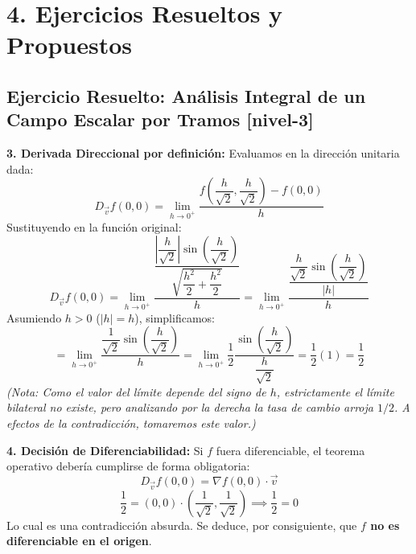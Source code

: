 \documentclass[11pt]{article}
\newenvironment{ejercicios}{%
  \section*{4. Ejercicios Resueltos y Propuestos}%
}{}
\newenvironment{ejercicioresuelto}[2]{\subsection*{Ejercicio Resuelto: #1 \small{[#2]}}}{}
\begin{document}
\begin{ejercicios}
\begin{ejercicioresuelto}{Análisis Integral de un Campo Escalar por Tramos}{nivel-3}
{      \vspace{0.2cm}
      \textbf{3. Derivada Direccional por definición:}
      Evaluamos en la dirección unitaria dada:
      $$ D_{\vec{v}} f(0,0) = \lim\limits_{h \to 0^+} \dfrac{f\left(\dfrac{h}{\sqrt{2}}, \dfrac{h}{\sqrt{2}}\right) - f(0,0)}{h} $$
      Sustituyendo en la función original:
      $$ D_{\vec{v}} f(0,0) = \lim\limits_{h \to 0^+} \dfrac{\dfrac{\left|\dfrac{h}{\sqrt{2}}\right| \sin\left(\dfrac{h}{\sqrt{2}}\right)}{\sqrt{\dfrac{h^2}{2} + \dfrac{h^2}{2}}}}{h} = \lim\limits_{h \to 0^+} \dfrac{\dfrac{\dfrac{h}{\sqrt{2}} \sin\left(\dfrac{h}{\sqrt{2}}\right)}{|h|}}{h} $$
      Asumiendo $h>0$ ($|h|=h$), simplificamos:
      $$ = \lim\limits_{h \to 0^+} \dfrac{\dfrac{1}{\sqrt{2}} \sin\left(\dfrac{h}{\sqrt{2}}\right)}{h} = \lim\limits_{h \to 0^+} \dfrac{1}{2} \dfrac{\sin\left(\dfrac{h}{\sqrt{2}}\right)}{\dfrac{h}{\sqrt{2}}} = \dfrac{1}{2} (1) = \dfrac{1}{2} $$
      \textit{(Nota: Como el valor del límite depende del signo de $h$, estrictamente el límite bilateral no existe, pero analizando por la derecha la tasa de cambio arroja $1/2$. A efectos de la contradicción, tomaremos este valor.)}

      \vspace{0.2cm}
      \textbf{4. Decisión de Diferenciabilidad:}
      Si $f$ fuera diferenciable, el teorema operativo debería cumplirse de forma obligatoria:
      $$ D_{\vec{v}} f(0,0) = \nabla f(0,0) \cdot \vec{v} $$
      $$ \dfrac{1}{2} = (0,0) \cdot \left(\dfrac{1}{\sqrt{2}}, \dfrac{1}{\sqrt{2}}\right) \implies \dfrac{1}{2} = 0 $$
      Lo cual es una contradicción absurda. Se deduce, por consiguiente, que \textbf{$f$ no es diferenciable en el origen}.
    }
  \end{ejercicioresuelto}


\end{ejercicios}
\end{document}
